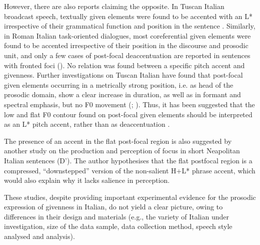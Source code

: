 However, there are also reports claiming the opposite. In Tuscan Italian broadcast speech, textually given elements were found to be accented with an L* irrespective of their grammatical function and position in the sentence \citep{Avesani1997}. Similarly, in Roman Italian task-oriented dialogues, most coreferential given elements were found to be accented irrespective of their position in the discourse and prosodic unit, and only a few cases of post-focal deaccentuation are reported in sentences with fronted foci (\citealt{AvesaniVayra2005}). No relation was found between a specific pitch accent and givenness. Further investigations on Tuscan Italian have found that post-focal given elements occurring in a metrically strong position, i.e. as head of the prosodic domain, show a clear increase in duration, as well as in formant and spectral emphasis, but no F0 movement (\citealt{Bocci2013}; \citealt{BocciAvesani2011,BocciAvesani2015}). Thus, it has been suggested that the low and flat F0 contour found on post-focal given elements should be interpreted as an L* pitch accent, rather than as deaccentuation \citep{Bocci2013}.

The presence of an accent in the flat post-focal region is also suggested by another study on the production and perception of focus in short Neapolitan Italian sentences (D’\citealt{Imperio2002}). The author hypothesises that the flat postfocal region is a compressed, “downstepped” version of the non-salient H+L* phrase accent, which would also explain why it lacks salience in perception.

These studies, despite providing important experimental evidence for the prosodic expression of givenness in Italian, do not yield a clear picture, owing to differences in their design and materials (e.g., the variety of Italian under investigation, size of the data sample, data collection method, speech style analysed and analysis). 

